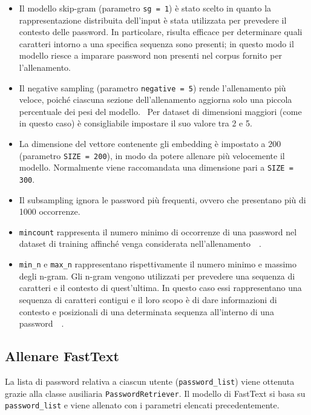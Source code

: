 \begin{itemize}
    \item Il modello skip-gram (parametro \texttt{sg = 1}) è stato scelto in quanto la rappresentazione distribuita dell'input è stata utilizzata per prevedere il contesto delle password. In particolare, risulta efficace per determinare quali caratteri intorno a una specifica sequenza sono presenti; in questo modo il modello riesce a imparare password non presenti nel corpus fornito per l'allenamento.~\cite{fasttext}
    \item Il negative sampling (parametro \texttt{negative = 5}) rende l'allenamento più veloce, poiché ciascuna sezione dell'allenamento aggiorna solo una piccola percentuale dei pesi del modello.~\cite{negative} Per dataset di dimensioni maggiori (come in questo caso) è consigliabile impostare il suo valore tra 2 e 5.~\cite{gensim}
    \item La dimensione del vettore contenente gli embedding è impostato a $200$ (parametro \texttt{SIZE = 200}), in modo da potere allenare più velocemente il modello. Normalmente viene raccomandata una dimensione pari a \texttt{SIZE = 300}.~\cite{gensim}
    \item Il subsampling ignora le password più frequenti, ovvero che presentano più di 1000 occorrenze.
    \item \texttt{mincount} rappresenta il numero minimo di occorrenze di una password nel dataset di training affinché venga considerata nell'allenamento~\cite{bijeeta}~\cite{gensim}.
    \item \texttt{min\_n} e \texttt{max\_n} rappresentano rispettivamente il numero minimo e massimo degli n-gram. Gli n-gram vengono utilizzati per prevedere una sequenza di caratteri e il contesto di quest'ultima. In questo caso essi rappresentano una sequenza di caratteri contigui e il loro scopo è di dare informazioni di contesto e posizionali di una determinata sequenza all'interno di una password~\cite{bijeeta}~\cite{gensim}.
\end{itemize}

\subsection{Allenare FastText}
\label{sec:allenare fasttext}
La lista di password relativa a ciascun utente (\texttt{password\_list}) viene ottenuta grazie alla classe ausiliaria \texttt{PasswordRetriever}. Il modello di FastText si basa su \texttt{password\_list} e viene allenato con i parametri elencati precedentemente.


